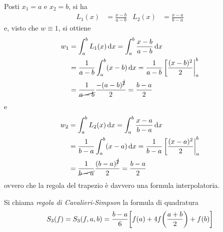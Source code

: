 	\begin{osservazione}
		Posti \(x_1 = a\) e \(x_2 = b\), si ha
		\begin{align*}
			L_1 (x) &= \frac{x - b}{a - b} &
			L_2 (x) &= \frac{x - a}{b - a}
		\end{align*}
		e, visto che \(w \equiv 1\), si ottiene
		\begin{equation*}
			\begin{split}
				w_1 &= \int_a^b L_1 (x) \dd{x} = \int_a^b \frac{x - b}{a - b} \dd{x} \\
				&= \frac{1}{a - b} \int_a^b (x - b) \dd{x} = \frac{1}{a - b} \eval[\frac{(x - b)^2}{2}|_a^b \\
				&= \frac{1}{\cancel{a - b}} \frac{- (a - b)^{\cancel{2}}}{2} = \frac{b - a}{2}
			\end{split}
		\end{equation*}
		e
		\begin{equation*}
			\begin{split}
				w_2 &= \int_a^b L_2 (x) \dd{x} = \int_a^b \frac{x - a}{b - a} \dd{x} \\
				&= \frac{1}{b - a} \int_a^b (x - a) \dd{x} = \frac{1}{b - a} \eval[\frac{(x - a)^2}{2}|_a^b \\
				&= \frac{1}{\cancel{b - a}} \frac{(b - a)^{\cancel{2}}}{2} = \frac{b - a}{2}
			\end{split}
		\end{equation*}
		ovvero che la regola del trapezio è davvero una formula interpolatoria.
	\end{osservazione}

	\begin{definizione}\label{def:regola-cavalieri}
		Si chiama \emph{regola di Cavalieri-Simpson} la formula di quadratura
		\begin{equation}\label{eq:regola-cavalieri}
			S_3 (f) = S_3 (f, a, b) = \frac{b - a}{6} \qty[f (a) + 4 f \qty(\frac{a + b}{2}) + f (b)]
		\end{equation}
	\end{definizione}

